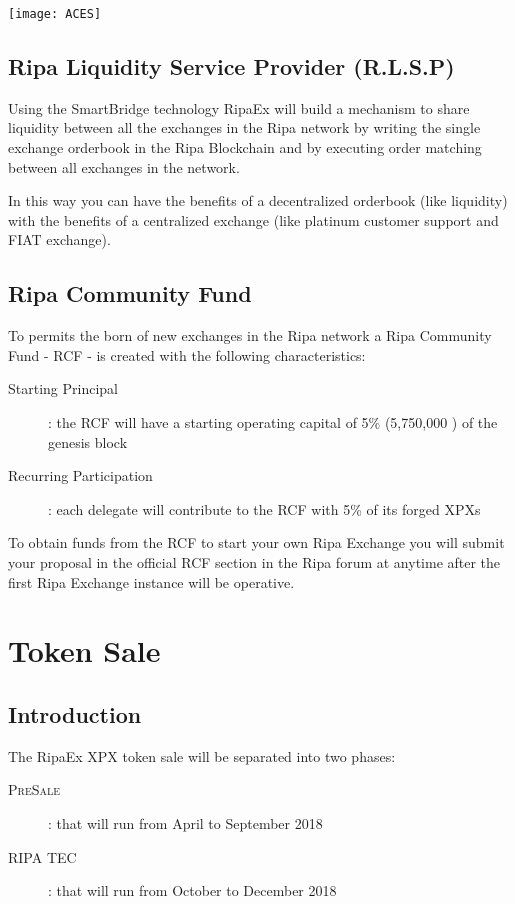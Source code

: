 \documentclass[11pt,fleqn,oneside]{book} %
\begin{document}
\begin{center}
	\texttt{[image: ACES]}
\end{center}

\section{Ripa Liquidity Service Provider (R.L.S.P)}
Using the SmartBridge technology RipaEx will build a mechanism to share liquidity between all the exchanges in the Ripa network
by writing the single exchange orderbook in the Ripa Blockchain and by executing order matching between all exchanges in the network.

In this way you can have the benefits of a decentralized orderbook (like liquidity) with the benefits of a centralized exchange (like
platinum customer support and FIAT exchange).

\section{Ripa Community Fund}
To permits the born of new exchanges in the Ripa network a Ripa Community Fund - RCF - is created with the following characteristics:
\begin{description}
	\item[Starting Principal]: the RCF will have a starting operating capital of 5\% (5,750,000 \PHP) of the genesis block
	\item[Recurring Participation]: each delegate will contribute to the RCF with 5\% of its forged XPXs
\end{description}

To obtain funds from the RCF to start your own Ripa Exchange you will submit your proposal in the official RCF section in the Ripa forum at
anytime after the first Ripa Exchange instance will be operative.


\chapter{Token Sale}
\section{Introduction}
The RipaEx XPX token sale will be separated into two phases:
	\begin{description}
		\item[\textsc{PreSale}]: that will run from April to September 2018
		\item[\textsc{RIPA TEC}]: that will run from October to December 2018
	\end{description}
\end{document}
